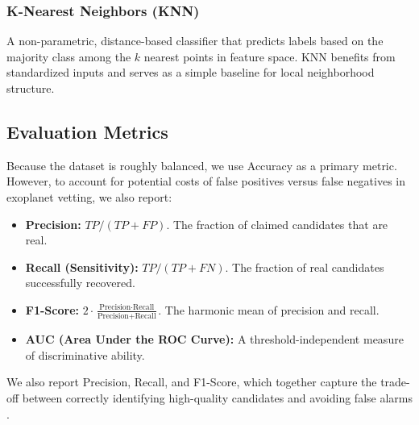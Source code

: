 \subsubsection{K-Nearest Neighbors (KNN)}
A non-parametric, distance-based classifier that predicts labels based on the majority class among the $k$ nearest points in feature space. KNN benefits from standardized inputs and serves as a simple baseline for local neighborhood structure.

\subsection{Evaluation Metrics}
Because the dataset is roughly balanced, we use Accuracy as a primary metric. However, to account for potential costs of false positives versus false negatives in exoplanet vetting, we also report:
\begin{itemize}
    \item \textbf{Precision:} $TP / (TP + FP)$. The fraction of claimed candidates that are real.
    \item \textbf{Recall (Sensitivity):} $TP / (TP + FN)$. The fraction of real candidates successfully recovered.
    \item \textbf{F1-Score:} $2 \cdot \frac{\text{Precision} \cdot \text{Recall}}{\text{Precision} + \text{Recall}}$. The harmonic mean of precision and recall.
    \item \textbf{AUC (Area Under the ROC Curve):} A threshold-independent measure of discriminative ability.
\end{itemize}
We also report Precision, Recall, and F1-Score, which together capture the trade-off between correctly identifying high-quality candidates and avoiding false alarms \cite{goutte2005probabilistic}.
